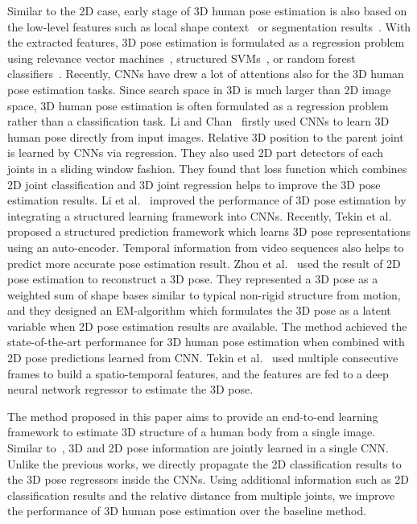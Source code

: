 \documentclass[runningheads]{llncs}
\begin{document}
Similar to the 2D case, early stage of 3D human pose estimation is also based on the low-level features such as local shape context~\cite{agarwal2006recovering} or segmentation results~\cite{ionescu2011latent}. With the extracted features, 3D pose estimation is formulated as a regression problem using relevance vector machines~\cite{agarwal2006recovering}, structured SVMs~\cite{ionescu2011latent}, or random forest classifiers~\cite{shotton2013real}. Recently, CNNs have drew a lot of attentions also for the 3D human pose estimation tasks. Since search space in 3D is much larger than 2D image space, 3D human pose estimation is often formulated as a regression problem rather than a classification task. Li and Chan~\cite{li20143d} firstly used CNNs to learn 3D human pose directly from input images. Relative 3D position to the parent joint is learned by CNNs via regression. They also used 2D part detectors of each joints in a sliding window fashion. They found that loss function which combines 2D joint classification and 3D joint regression helps to improve the 3D pose estimation results. Li et al.~\cite{li2015maximum} improved the performance of 3D pose estimation by integrating a structured learning framework into CNNs. Recently, Tekin et al.~\cite{tekin2016structured} proposed a structured prediction framework which learns 3D pose representations using an auto-encoder. Temporal information from video sequences also helps to predict more accurate pose estimation result. Zhou et al.~\cite{Zhou_2016_CVPR} used the result of 2D pose estimation to reconstruct a 3D pose. They represented a 3D pose as a weighted sum of shape bases similar to typical non-rigid structure from motion, and they designed an EM-algorithm which formulates the 3D pose as a latent variable when 2D pose estimation results are available. The method achieved the state-of-the-art performance for 3D human pose estimation when combined with 2D pose predictions learned from CNN. Tekin et al.~\cite{Tekin_2016_CVPR} used multiple consecutive frames to build a spatio-temporal features, and the features are fed to a deep neural network regressor to estimate the 3D pose.

The method proposed in this paper aims to provide an end-to-end learning framework to estimate 3D structure of a human body from a single image. Similar to~\cite{li20143d}, 3D and 2D pose information are jointly learned in a single CNN. Unlike the previous works, we directly propagate the 2D classification results to the 3D pose regressors inside the CNNs. Using additional information such as 2D classification results and the relative distance from multiple joints, we improve the performance of 3D human pose estimation over the baseline method.
\end{document}
